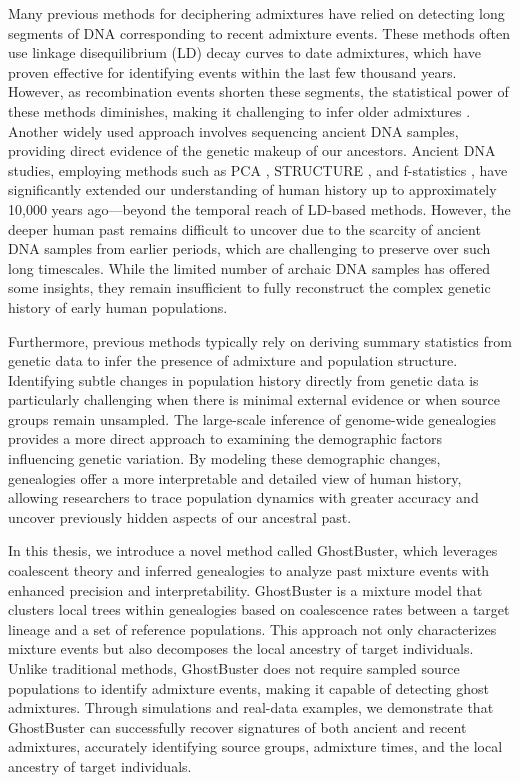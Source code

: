 Many previous methods for deciphering admixtures have relied on detecting long segments of DNA corresponding to recent admixture events. These methods often use linkage disequilibrium (LD) decay curves to date admixtures, which have proven effective for identifying events within the last few thousand years. However, as recombination events shorten these segments, the statistical power of these methods diminishes, making it challenging to infer older admixtures \cite{hellenthal2014genetic, loh2013inferring, moorjani2011history, patterson2012ancient}. Another widely used approach involves sequencing ancient DNA samples, providing direct evidence of the genetic makeup of our ancestors. Ancient DNA studies, employing methods such as PCA \cite{Patterson2006}, STRUCTURE \cite{Pritchard2000}, and f-statistics \cite{reich2009reconstructing,reich2012reconstructing,patterson2012ancient,haak2015massive,durand2011testing}, have significantly extended our understanding of human history up to approximately 10,000 years ago—beyond the temporal reach of LD-based methods. However, the deeper human past remains difficult to uncover due to the scarcity of ancient DNA samples from earlier periods, which are challenging to preserve over such long timescales. While the limited number of archaic DNA samples has offered some insights, they remain insufficient to fully reconstruct the complex genetic history of early human populations.

Furthermore, previous methods typically rely on deriving summary statistics from genetic data to infer the presence of admixture and population structure. Identifying subtle changes in population history directly from genetic data is particularly challenging when there is minimal external evidence or when source groups remain unsampled. The large-scale inference of genome-wide genealogies provides a more direct approach to examining the demographic factors influencing genetic variation. By modeling these demographic changes, genealogies offer a more interpretable and detailed view of human history, allowing researchers to trace population dynamics with greater accuracy and uncover previously hidden aspects of our ancestral past.

In this thesis, we introduce a novel method called GhostBuster, which leverages coalescent theory and inferred genealogies to analyze past mixture events with enhanced precision and interpretability. GhostBuster is a mixture model that clusters local trees within genealogies based on coalescence rates between a target lineage and a set of reference populations. This approach not only characterizes mixture events but also decomposes the local ancestry of target individuals. Unlike traditional methods, GhostBuster does not require sampled source populations to identify admixture events, making it capable of detecting ghost admixtures. Through simulations and real-data examples, we demonstrate that GhostBuster can successfully recover signatures of both ancient and recent admixtures, accurately identifying source groups, admixture times, and the local ancestry of target individuals.

